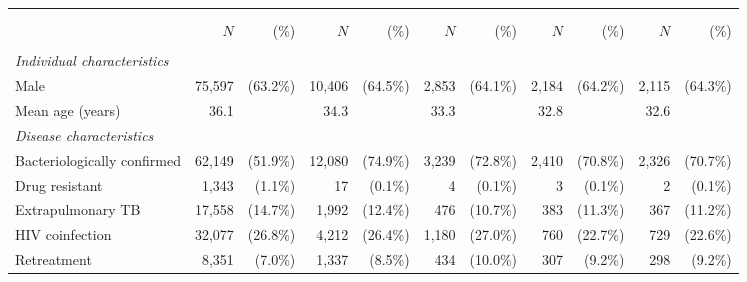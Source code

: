 \scriptsize{
\begin{tabular}{l|rr|rr|rr|rr|rr}
\hline\hline \\[-8pt]
 &  &  &  &  &  \\
 & $N$ & (\%) & $N$ & (\%) & $N$ & (\%) & $N$ & (\%) & $N$ & (\%) \\ \hline \\[-8pt]
\textit{Individual characteristics} &  &  &  &  &  &  &  &  &  &  \\
\quad Male & 75,597 & (63.2\%) & 10,406 & (64.5\%) & 2,853 & (64.1\%) & 2,184 & (64.2\%) & 2,115 & (64.3\%) \\
\quad Mean age (years) & 36.1 &  & 34.3 &  & 33.3 &  & 32.8 &  & 32.6 &  \\
\rule{0pt}{14pt}\textit{Disease characteristics} &  &  &  &  &  &  &  &  &  &  \\
\quad Bacteriologically confirmed & 62,149 & (51.9\%) & 12,080 & (74.9\%) & 3,239 & (72.8\%) & 2,410 & (70.8\%) & 2,326 & (70.7\%) \\
\quad Drug resistant & 1,343 & (1.1\%) & 17 & (0.1\%) & 4 & (0.1\%) & 3 & (0.1\%) & 2 & (0.1\%) \\
\quad Extrapulmonary TB & 17,558 & (14.7\%) & 1,992 & (12.4\%) & 476 & (10.7\%) & 383 & (11.3\%) & 367 & (11.2\%) \\
\quad HIV coinfection & 32,077 & (26.8\%) & 4,212 & (26.4\%) & 1,180 & (27.0\%) & 760 & (22.7\%) & 729 & (22.6\%) \\
\quad Retreatment & 8,351 & (7.0\%) & 1,337 & (8.5\%) & 434 & (10.0\%) & 307 & (9.2\%) & 298 & (9.2\%) \\
\hline\hline
\end{tabular}}